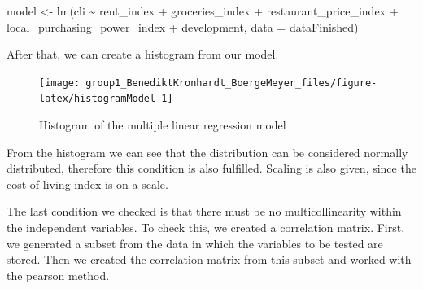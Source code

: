 \documentclass[
  11pt,
  a4paper,
  twoside]{scrbook}
\newenvironment{Shaded}{\begin{snugshade}}{\end{snugshade}}
\newcommand{\AttributeTok}[1]{\textcolor[rgb]{0.77,0.63,0.00}{#1}}
\newcommand{\FunctionTok}[1]{\textcolor[rgb]{0.00,0.00,0.00}{#1}}
\newcommand{\NormalTok}[1]{#1}
\newcommand{\OtherTok}[1]{\textcolor[rgb]{0.56,0.35,0.01}{#1}}
\newcommand{\SpecialCharTok}[1]{\textcolor[rgb]{0.00,0.00,0.00}{#1}}
\begin{document}
\linespread{1}

\begin{Shaded}
\begin{Highlighting}[]
\NormalTok{model }\OtherTok{\textless{}{-}} \FunctionTok{lm}\NormalTok{(cli }\SpecialCharTok{\textasciitilde{}}\NormalTok{ rent\_index }\SpecialCharTok{+}\NormalTok{ groceries\_index }\SpecialCharTok{+}\NormalTok{ restaurant\_price\_index }
            \SpecialCharTok{+}\NormalTok{ local\_purchasing\_power\_index }\SpecialCharTok{+}\NormalTok{ development, }\AttributeTok{data =}\NormalTok{ dataFinished)}
\end{Highlighting}
\end{Shaded}

\linespread{1}

After that, we can create a histogram from our model.

\begin{figure}

{\centering \texttt{[image: group1\_BenediktKronhardt\_BoergeMeyer\_files/figure-latex/histogramModel-1]} 

}

\caption{Histogram of the multiple linear regression model}\label{fig:histogramModel}
\end{figure}

From the histogram we can see that the distribution can be considered normally distributed, therefore this condition is also fulfilled.
Scaling is also given, since the cost of living index is on a scale.

The last condition we checked is that there must be no multicollinearity within the independent variables.
To check this, we created a correlation matrix. First, we generated a subset from the data in which the variables to be tested are stored. Then we created the correlation matrix from this subset and worked with the pearson method.
\end{document}
